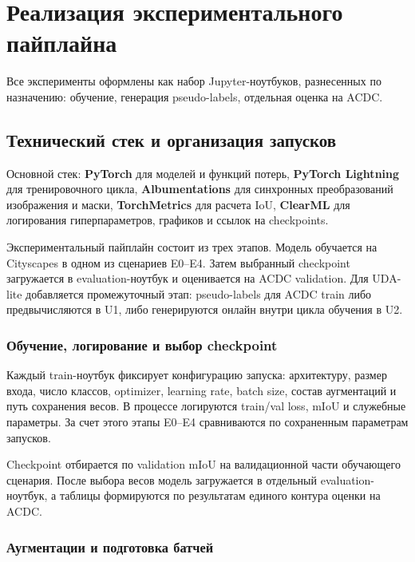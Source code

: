 \documentclass[14pt,a4paper]{extarticle}
\begin{document}
\newpage

\section{Реализация экспериментального пайплайна}

Все эксперименты оформлены как набор Jupyter-ноутбуков, разнесенных по назначению: обучение, генерация pseudo-labels, отдельная оценка на ACDC.

\subsection{Технический стек и организация запусков}

Основной стек: \textbf{PyTorch} для моделей и функций потерь, \textbf{PyTorch Lightning} для тренировочного цикла, \textbf{Albumentations} для синхронных преобразований изображения и маски, \textbf{TorchMetrics} для расчета IoU, \textbf{ClearML} для логирования гиперпараметров, графиков и ссылок на checkpoints.

Экспериментальный пайплайн состоит из трех этапов. Модель обучается на Cityscapes в одном из сценариев E0--E4. Затем выбранный checkpoint загружается в evaluation-ноутбук и оценивается на ACDC validation. Для UDA-lite добавляется промежуточный этап: pseudo-labels для ACDC train либо предвычисляются в U1, либо генерируются онлайн внутри цикла обучения в U2.

\subsubsection{Обучение, логирование и выбор checkpoint}

Каждый train-ноутбук фиксирует конфигурацию запуска: архитектуру, размер входа, число классов, optimizer, learning rate, batch size, состав аугментаций и путь сохранения весов. В процессе логируются train/val loss, mIoU и служебные параметры. За счет этого этапы E0--E4 сравниваются по сохраненным параметрам запусков.

Checkpoint отбирается по validation mIoU на валидационной части обучающего сценария. После выбора весов модель загружается в отдельный evaluation-ноутбук, а таблицы формируются по результатам единого контура оценки на ACDC.

\subsubsection{Аугментации и подготовка батчей}
\end{document}
